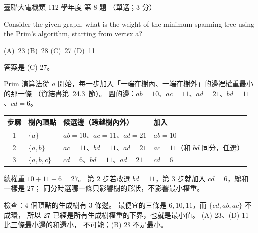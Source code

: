\begin{pastexam}[label={px:ust-112-ee-ds-08}]{臺聯大電機類 112 學年度 第 8 題}
（單選；3 分）

Consider the given graph, what is the weight of the minimum spanning tree using the Prim's
algorithm, starting from vertex a?

\begin{center}
\end{center}

(A)~23 \qquad (B)~28 \qquad (C)~27 \qquad (D)~11
\end{pastexam}

\begin{pastsoln}
答案是 (C) 27。

Prim 演算法從 $a$ 開始，每一步加入「一端在樹內、一端在樹外」的邊裡權重最小的那一條
（資結書第~24.3~節）。 圖的邊：$ab = 10$、$ac = 11$、$ad = 21$、$bd = 11$、$cd = 6$。

\begin{center}
\begin{tabular}{clll}
\toprule
步驟 & 樹內頂點 & 候選邊（跨越樹內外） & 加入 \\
\midrule
1 & $\{a\}$ & $ab = 10$、$ac = 11$、$ad = 21$ & $ab = 10$ \\
2 & $\{a, b\}$ & $ac = 11$、$bd = 11$、$ad = 21$ & $ac = 11$（和 $bd$ 同分，任選） \\
3 & $\{a, b, c\}$ & $cd = 6$、$bd = 11$、$ad = 21$ & $cd = 6$ \\
\bottomrule
\end{tabular}
\end{center}
總權重 $10 + 11 + 6 = 27$。 第 2 步若改選 $bd = 11$，第 3 步就加入 $cd = 6$，總和一樣是 $27$；
同分時選哪一條只影響樹的形狀，不影響最小權重。

檢查：$4$ 個頂點的生成樹有 $3$ 條邊。 最便宜的三條是 $6, 10, 11$，而 $\{cd, ab, ac\}$ 不成環，
所以 $27$ 已經是所有生成樹權重的下界，也就是最小值。 (A) 23、(D) 11 比三條最小邊的和還小，
不可能；(B) 28 不是最小。
\end{pastsoln}
